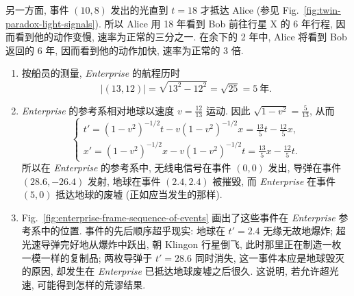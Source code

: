 \begin{description}[font=\normalfont,leftmargin=2em,labelwidth=1.5em]
\begin{enumerate}[label=(\alph*),ref=\alph*,leftmargin=*]
另一方面, 事件 $(10,8)$ 发出的光直到 $t=18$ 才抵达 Alice (参见 Fig.~\ref{fig:twin-paradox-light-signals}). 所以 Alice 用 18 年看到 Bob 前往行星 X 的 6 年行程, 因而看到他的动作变慢, 速率为正常的三分之一. 在余下的 2 年中, Alice 将看到 Bob 返回的 6 年, 因而看到他的动作加快, 速率为正常的 3 倍.
\end{enumerate}

\begin{enumerate}[label=(\alph*),ref=\alph*,leftmargin=*]
\item 按船员的测量, \emph{Enterprise} 的航程历时
\[
  |(13,12)|=\sqrt{13^2-12^2}=\sqrt{25}=5\ \text{年}.
\]
\item \emph{Enterprise} 的参考系相对地球以速度 $v=\frac{12}{13}$ 运动. 因此 $\sqrt{1-v^2}=\frac5{13}$, 从而
\[
  \begin{cases}
    t'=(1-v^2)^{-1/2}t-v(1-v^2)^{-1/2}x=\frac{13}{5}t-\frac{12}{5}x,\\[2pt]
    x'=(1-v^2)^{-1/2}x-v(1-v^2)^{-1/2}t=\frac{13}{5}x-\frac{12}{5}t.
  \end{cases}
\]
所以在 \emph{Enterprise} 的参考系中, 无线电信号在事件 $(0,0)$ 发出, 导弹在事件 $(28.6,-26.4)$ 发射, 地球在事件 $(2.4,2.4)$ 被摧毁, 而 \emph{Enterprise} 在事件 $(5,0)$ 抵达地球的废墟 (正如应当发生的那样).
\item Fig.~\ref{fig:enterprise-frame-sequence-of-events} 画出了这些事件在 \emph{Enterprise} 参考系中的位置. 事件的先后顺序超乎现实: 地球在 $t'=2.4$ 无缘无故地爆炸; 超光速导弹完好地从爆炸中跃出, 朝 Klingon 行星倒飞, 此时那里正在制造一枚一模一样的复制品; 两枚导弹于 $t'=28.6$ 同时消失, 这一事件本应是地球毁灭的原因, 却发生在 \emph{Enterprise} 已抵达地球废墟之后很久. 这说明, 若允许超光速, 可能得到怎样的荒谬结果.
\end{enumerate}
\end{description}
